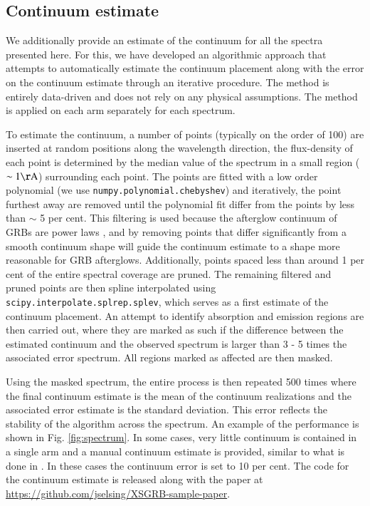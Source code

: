 \documentclass{aa}    %
\begin{document}
\subsection{Continuum estimate} \label{continuum}

We additionally provide an estimate of the continuum for all the spectra
presented here. For this, we have developed an algorithmic approach that
attempts to automatically estimate the continuum placement along with the error on
the continuum estimate through an iterative procedure. The method is entirely
data-driven and does not rely on any physical assumptions. The method is applied on
each arm separately for each spectrum.

To estimate the continuum, a number of points (typically on the order of 100)
are inserted at random positions along the wavelength direction, the
flux-density of each point is determined by the median value of the spectrum in
a small region ($\sim 1 \mathrm{\AA}$) surrounding each point. The points are
fitted with a low order polynomial (we use \texttt{numpy.polynomial.chebyshev})
and iteratively, the point furthest away are removed until the polynomial fit
differ from the points by less than $\sim$ 5 per cent. This filtering is used
because the afterglow continuum of GRBs are power laws \citep{Piran2005}, and by
removing points that differ significantly from a smooth continuum shape will
guide the continuum estimate to a shape more reasonable for GRB afterglows.
Additionally, points spaced less than around 1 per cent of the entire spectral
coverage are pruned. The remaining filtered and pruned points are then spline
interpolated using \texttt{scipy.interpolate.splrep.splev}, which serves as a
first estimate of the continuum placement. An attempt to identify absorption and
emission regions are then carried out, where they are marked as such if the
difference between the estimated continuum and the observed spectrum is larger
than 3 - 5 times the associated error spectrum. All regions marked as affected
are then masked.

Using the masked spectrum, the entire process is then repeated 500 times where
the final continuum estimate is the mean of the continuum realizations and the
associated error estimate is the standard deviation. This error reflects the
stability of the algorithm across the spectrum. An example of the performance is
shown in Fig. \ref{fig:spectrum}. In some cases, very little continuum is
contained in a single arm and a manual continuum estimate is provided, similar
to what is done in \citet{Lopez2016}. In these cases the continuum error is set
to 10 per cent. The code for the continuum estimate is released along with the
paper at \url{https://github.com/jselsing/XSGRB-sample-paper}.
                                                                                           
\end{document}
